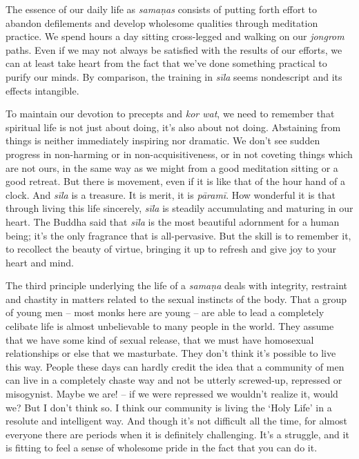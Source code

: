 The essence of our daily life as \emph{samaṇas} consists of putting
forth effort to abandon defilements and develop wholesome qualities
through meditation practice. We spend hours a day sitting cross-legged
and walking on our \emph{jongrom} paths. Even if we may not always be
satisfied with the results of our efforts, we can at least take heart
from the fact that we've done something practical to purify our minds. 
By comparison, the training in \emph{sīla} seems nondescript and its
effects intangible. 

To maintain our devotion to precepts and \emph{kor wat}, we need to
remember that spiritual life is not just about doing, it's also about
not doing. Abstaining from things is neither immediately inspiring nor
dramatic. We don't see sudden progress in non-harming or in
non-acquisitiveness, or in not coveting things which are not ours, in
the same way as we might from a good meditation sitting or a good
retreat. But there is movement, even if it is like that of the hour hand
of a clock. And \emph{sīla} is a treasure. It is merit, it is
\emph{pāramī}. How wonderful it is that through living this life
sincerely, \emph{sīla} is steadily accumulating and maturing in our
heart. The Buddha said that \emph{sīla} is the most beautiful adornment
for a human being; it's the only fragrance that is all-pervasive. But
the skill is to remember it, to recollect the beauty of virtue, bringing
it up to refresh and give joy to your heart and mind. 

The third principle underlying the life of a \emph{samaṇa} deals with
integrity, restraint and chastity in matters related to the sexual
instincts of the body. That a group of young men -- most monks here are
young -- are able to lead a completely celibate life is almost
unbelievable to many people in the world. They assume that we have some
kind of sexual release, that we must have homosexual relationships or
else that we masturbate. They don't think it's possible to live this
way. People these days can hardly credit the idea that a community of
men can live in a completely chaste way and not be utterly screwed-up, 
repressed or misogynist. Maybe we are! -- if we were repressed we
wouldn't realize it, would we? But I don't think so. I think our
community is living the `Holy Life' in a resolute and intelligent way. 
And though it's not difficult all the time, for almost everyone there
are periods when it is definitely challenging. It's a struggle, and it
is fitting to feel a sense of wholesome pride in the fact that you can
do it. 

